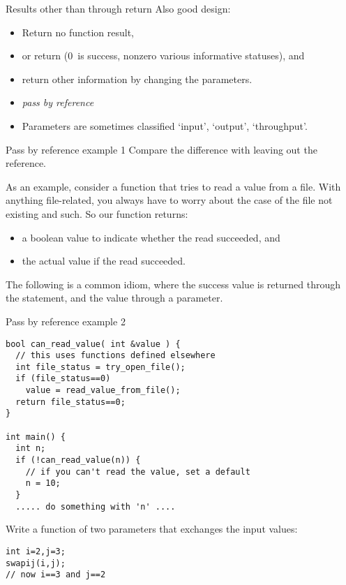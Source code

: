 \begin{slide}{Results other than through return}
  \label{sl:func-err-return}
  Also good design:
  \begin{itemize}
  \item Return no function result,
  \item or return  (0~is success, nonzero various
    informative statuses), and
  \item return other information by changing the parameters.
  \item \emph{pass by reference}
  \item Parameters are sometimes classified `input', `output', `throughput'.
  \end{itemize}
\end{slide}

\begin{block}{Pass by reference example 1}
  \label{sl:pass-reference1}
  Compare the difference with leaving out the reference.
\end{block}

As an example, consider a function that tries to read a value from a
file. With anything file-related, you always have to worry about the
case of the file not existing and such. So our function returns:
\begin{itemize}
\item a boolean value to indicate whether the read succeeded, and
\item the actual value if the read succeeded.
\end{itemize}
The following is a common idiom, where the success value is returned
through the  statement, and the value through a parameter.

\begin{block}{Pass by reference example 2}
  \label{sl:pass-reference2}
\begin{lstlisting}
bool can_read_value( int &value ) {
  // this uses functions defined elsewhere
  int file_status = try_open_file();
  if (file_status==0) 
    value = read_value_from_file();
  return file_status==0;
}

int main() {
  int n;
  if (!can_read_value(n)) {
    // if you can't read the value, set a default
    n = 10;
  }
  ..... do something with 'n' ....
\end{lstlisting}
\end{block}

\begin{exercise}
  \label{ex:swap}
  Write a  function  of two parameters that
  exchanges the input values:
\begin{lstlisting}
int i=2,j=3;
swapij(i,j);
// now i==3 and j==2
\end{lstlisting}
\end{exercise}

